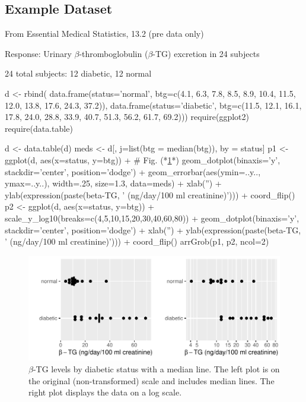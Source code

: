 \subsection{Example Dataset} 

\bi
  \item From Essential Medical Statistics, 13.2 (pre data only)
  \item Response: Urinary $\beta$-thromboglobulin ($\beta$-TG) excretion in 24 subjects
  \item 24 total subjects: 12 diabetic, 12 normal
\ei

\begin{Schunk}
\begin{Sinput}
d <- rbind(
  data.frame(status='normal',
             btg=c(4.1, 6.3, 7.8, 8.5, 8.9, 10.4, 11.5, 12.0, 13.8,
                   17.6, 24.3, 37.2)),
  data.frame(status='diabetic',
             btg=c(11.5, 12.1, 16.1, 17.8, 24.0, 28.8, 33.9, 40.7,
                   51.3, 56.2, 61.7, 69.2)))
require(ggplot2)
require(data.table)
\end{Sinput}
\begin{Sinput}
d <- data.table(d)
meds <- d[, j=list(btg = median(btg)), by = status]
p1 <- 
  ggplot(d, aes(x=status, y=btg)) +    # Fig. (*\ref{fig:change-diabetes}*)
  geom_dotplot(binaxis='y', stackdir='center', position='dodge') +
  geom_errorbar(aes(ymin=..y.., ymax=..y..), width=.25, size=1.3, data=meds) +
   xlab('') + ylab(expression(paste(beta-TG, ' (ng/day/100 ml creatinine)'))) + 
  coord_flip()
p2 <- ggplot(d, aes(x=status, y=btg)) +
  scale_y_log10(breaks=c(4,5,10,15,20,30,40,60,80)) +
  geom_dotplot(binaxis='y', stackdir='center', position='dodge') +
  xlab('') + ylab(expression(paste(beta-TG, ' (ng/day/100 ml creatinine)'))) +
  coord_flip()
arrGrob(p1, p2, ncol=2)
\end{Sinput}
\begin{figure}[htbp]

\centerline{\includegraphics[width=\maxwidth]{change-diabetes-1} }

\caption[$\beta$-TG levels by diabetic status]{$\beta$-TG levels by diabetic status with a median line.  The left plot is on the original (non-transformed) scale and includes median lines.  The right plot displays the data on a log scale.}\label{fig:change-diabetes}
\end{figure}
\end{Schunk}

